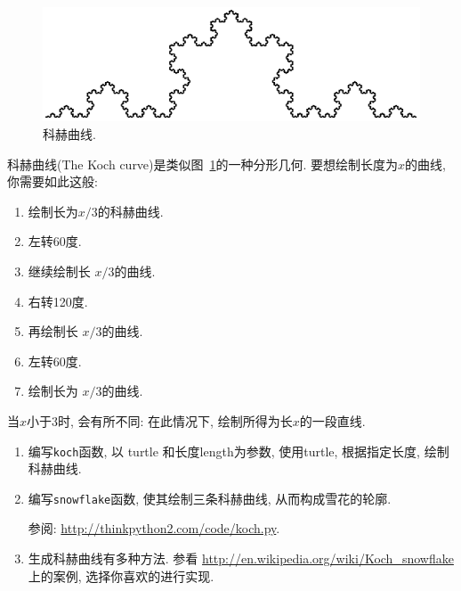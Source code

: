 \documentclass[10pt]{book}
\begin{document}
\begin{figure}
\centerline
{\includegraphics[scale=0.8]{figs/koch.pdf}}
\caption{科赫曲线.}
\label{fig.koch}
\end{figure}

\begin{exercise}

科赫曲线(The Koch curve)是类似图~\ref{fig.koch}的一种分形几何. 
要想绘制长度为$x$的曲线, 你需要如此这般:

\begin{enumerate}

\item 绘制长为$x/3$的科赫曲线. 

\item 左转60度. 

\item 继续绘制长 $x/3$的曲线. 

\item 右转120度. 

\item 再绘制长 $x/3$的曲线. 

\item 左转60度. 

\item 绘制长为 $x/3$的曲线. 

\end{enumerate}

当$x$小于3时, 会有所不同: 在此情况下, 绘制所得为长$x$的一段直线. 

\begin{enumerate}

\item 编写{\tt koch}函数, 以 turtle 和长度length为参数, 使用turtle, 根据指定长度, 绘制
科赫曲线. 

\item 编写{\tt snowflake}函数, 使其绘制三条科赫曲线, 
从而构成雪花的轮廓.

参阅: \url{http://thinkpython2.com/code/koch.py}.

\item 生成科赫曲线有多种方法. 参看
\url{http://en.wikipedia.org/wiki/Koch_snowflake} 上的案例, 选择你喜欢的进行实现. 


\end{enumerate}
\end{exercise}
\end{document}
